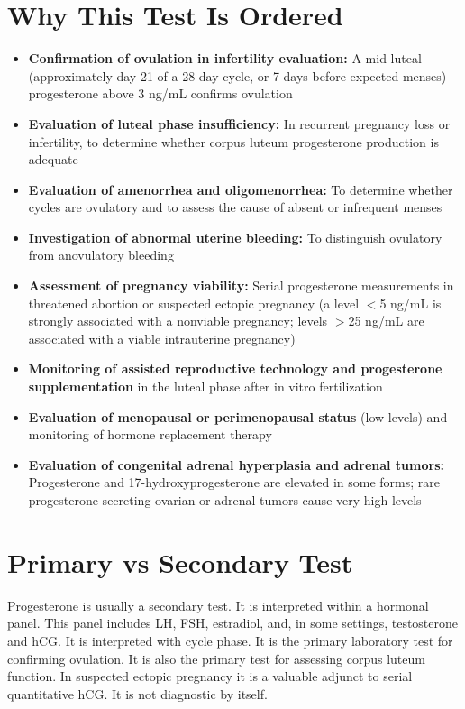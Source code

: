 \section*{Why This Test Is Ordered}
\begin{itemize}
  \item \textbf{Confirmation of ovulation in infertility evaluation:} A mid-luteal (approximately day 21 of a 28-day cycle, or 7 days before expected menses) progesterone above 3 ng/mL confirms ovulation \cite{speroff2011clinical}
  \item \textbf{Evaluation of luteal phase insufficiency:} In recurrent pregnancy loss or infertility, to determine whether corpus luteum progesterone production is adequate
  \item \textbf{Evaluation of amenorrhea and oligomenorrhea:} To determine whether cycles are ovulatory and to assess the cause of absent or infrequent menses
  \item \textbf{Investigation of abnormal uterine bleeding:} To distinguish ovulatory from anovulatory bleeding
  \item \textbf{Assessment of pregnancy viability:} Serial progesterone measurements in threatened abortion or suspected ectopic pregnancy (a level $<$5 ng/mL is strongly associated with a nonviable pregnancy; levels $>$25 ng/mL are associated with a viable intrauterine pregnancy) \cite{pisarska1999incidence}
  \item \textbf{Monitoring of assisted reproductive technology and progesterone supplementation} in the luteal phase after in vitro fertilization \cite{daya2009luteal}
  \item \textbf{Evaluation of menopausal or perimenopausal status} (low levels) and monitoring of hormone replacement therapy
  \item \textbf{Evaluation of congenital adrenal hyperplasia and adrenal tumors:} Progesterone and 17-hydroxyprogesterone are elevated in some forms; rare progesterone-secreting ovarian or adrenal tumors cause very high levels
\end{itemize}

\section*{Primary vs Secondary Test}
Progesterone is usually a secondary test. It is interpreted within a hormonal panel. This panel includes LH, FSH, estradiol, and, in some settings, testosterone and hCG. It is interpreted with cycle phase. It is the primary laboratory test for confirming ovulation. It is also the primary test for assessing corpus luteum function. In suspected ectopic pregnancy it is a valuable adjunct to serial quantitative hCG. It is not diagnostic by itself.

